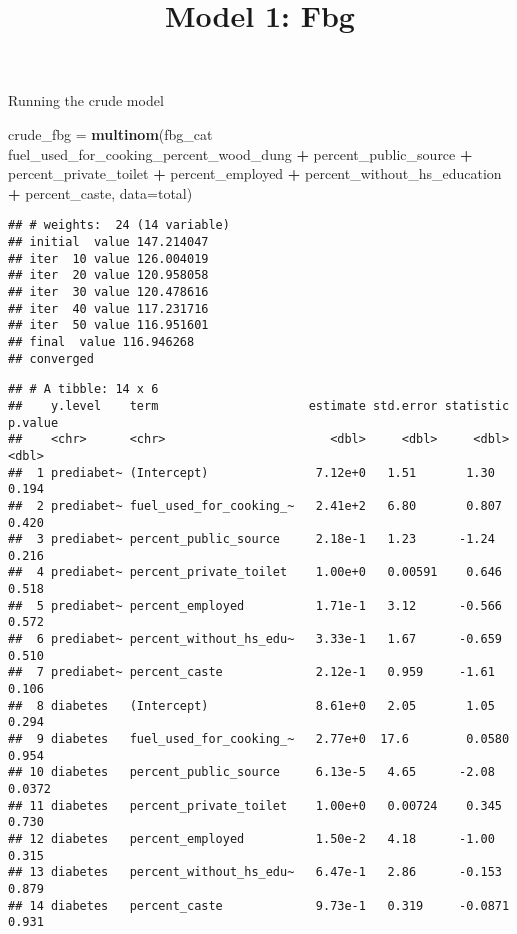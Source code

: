 \documentclass[]{article}
\title{Model 1: Fbg}
\author{}
\date{}
\newenvironment{Shaded}{\begin{snugshade}}{\end{snugshade}}
\newcommand{\DataTypeTok}[1]{\textcolor[rgb]{0.13,0.29,0.53}{#1}}
\newcommand{\KeywordTok}[1]{\textcolor[rgb]{0.13,0.29,0.53}{\textbf{#1}}}
\newcommand{\NormalTok}[1]{#1}
\newcommand{\OperatorTok}[1]{\textcolor[rgb]{0.81,0.36,0.00}{\textbf{#1}}}
\newcommand{\StringTok}[1]{\textcolor[rgb]{0.31,0.60,0.02}{#1}}
\begin{document}
\maketitle

Running the crude model

\begin{Shaded}
\begin{Highlighting}[]
\NormalTok{crude_fbg =}\StringTok{ }
\StringTok{  }\KeywordTok{multinom}\NormalTok{(fbg_cat }\OperatorTok{~}\StringTok{ }\NormalTok{fuel_used_for_cooking_percent_wood_dung }\OperatorTok{+}\StringTok{ }\NormalTok{percent_public_source }\OperatorTok{+}\StringTok{ }\NormalTok{percent_private_toilet }\OperatorTok{+}\StringTok{ }\NormalTok{percent_employed }\OperatorTok{+}\StringTok{ }\NormalTok{percent_without_hs_education }\OperatorTok{+}\StringTok{ }\NormalTok{percent_caste, }\DataTypeTok{data=}\NormalTok{total)}
\end{Highlighting}
\end{Shaded}

\begin{verbatim}
## # weights:  24 (14 variable)
## initial  value 147.214047 
## iter  10 value 126.004019
## iter  20 value 120.958058
## iter  30 value 120.478616
## iter  40 value 117.231716
## iter  50 value 116.951601
## final  value 116.946268 
## converged
\end{verbatim}

\begin{Shaded}
\end{Shaded}

\begin{verbatim}
## # A tibble: 14 x 6
##    y.level    term                     estimate std.error statistic p.value
##    <chr>      <chr>                       <dbl>     <dbl>     <dbl>   <dbl>
##  1 prediabet~ (Intercept)               7.12e+0   1.51       1.30    0.194 
##  2 prediabet~ fuel_used_for_cooking_~   2.41e+2   6.80       0.807   0.420 
##  3 prediabet~ percent_public_source     2.18e-1   1.23      -1.24    0.216 
##  4 prediabet~ percent_private_toilet    1.00e+0   0.00591    0.646   0.518 
##  5 prediabet~ percent_employed          1.71e-1   3.12      -0.566   0.572 
##  6 prediabet~ percent_without_hs_edu~   3.33e-1   1.67      -0.659   0.510 
##  7 prediabet~ percent_caste             2.12e-1   0.959     -1.61    0.106 
##  8 diabetes   (Intercept)               8.61e+0   2.05       1.05    0.294 
##  9 diabetes   fuel_used_for_cooking_~   2.77e+0  17.6        0.0580  0.954 
## 10 diabetes   percent_public_source     6.13e-5   4.65      -2.08    0.0372
## 11 diabetes   percent_private_toilet    1.00e+0   0.00724    0.345   0.730 
## 12 diabetes   percent_employed          1.50e-2   4.18      -1.00    0.315 
## 13 diabetes   percent_without_hs_edu~   6.47e-1   2.86      -0.153   0.879 
## 14 diabetes   percent_caste             9.73e-1   0.319     -0.0871  0.931
\end{verbatim}
\end{document}
